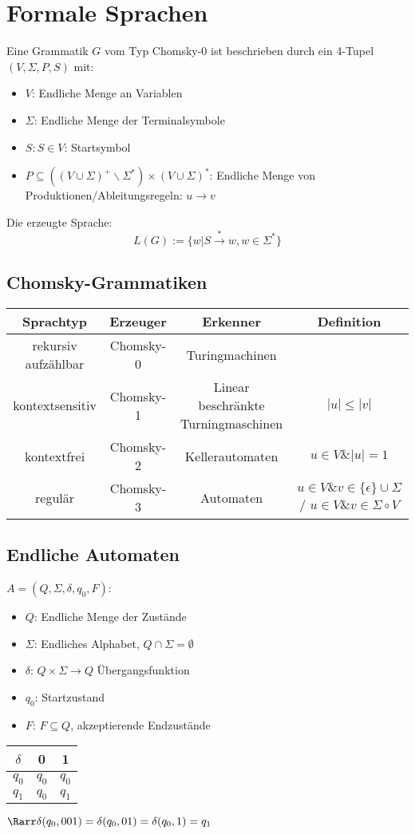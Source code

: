 \documentclass{article}
\begin{document}
\section{Formale Sprachen}
Eine Grammatik $G$ vom Typ Chomsky-0 ist beschrieben durch ein 4-Tupel$(V,\Sigma,P,S)$ mit:
\begin{itemize}
	\item $V$: Endliche Menge an Variablen
	\item $\Sigma$: Endliche Menge der Terminalsymbole
	\item $S:S\in V$: Startsymbol
	\item $P\subseteq((V\cup\Sigma)^+\backslash\Sigma^*)\times(V\cup\Sigma)^*$: Endliche Menge von Produktionen/Ableitungsregeln: $u\to v$
\end{itemize}
Die erzeugte Sprache:
$$
	L(G):=\{w|S\xrightarrow{*}w, w\in\Sigma^*\}
$$
\subsection{Chomsky-Grammatiken}
\begin{tabular}{c|c|c|c}
	Sprachtyp & Erzeuger & Erkenner & Definition \\
	\hline
	rekursiv aufzählbar & Chomsky-0 & Turingmachinen & \\
	\hline
	kontextsensitiv & Chomsky-1 & Linear beschränkte Turningmaschinen & $|u|\leq|v|$ \\
	\hline
	kontextfrei & Chomsky-2 & Kellerautomaten & $u\in V \& |u|=1$\\
	\hline
	regulär & Chomsky-3 & Automaten & $u\in V \& v\in\{\epsilon\}\cup\Sigma$ / $u\in V \& v\in\Sigma\circ V$
\end{tabular}
\subsection{Endliche Automaten}
$A=(Q,\Sigma, \delta, q_0, F)$:
\begin{itemize}
	\item $Q$: Endliche Menge der Zustände
	\item $\Sigma$: Endliches Alphabet, $Q\cap\Sigma=\emptyset$
	\item $\delta$: $Q\times\Sigma\to Q$ Übergangsfunktion
	\item $q_0$: Startzustand
	\item $F$: $F\subseteq Q$, akzeptierende Endzustände
\end{itemize}
\begin{tabular}{c|c|c}
	$\delta$ & 0 & 1\\
	\hline
	$q_0$ & $q_0$ & $q_0$\\
	$q_1$ & $q_0$ & $q_1$ 
\end{tabular}
$\Rarr \delta(q_0, 001)= \delta(q_0, 01)=\delta(q_0, 1)=q_1$
\end{document}
